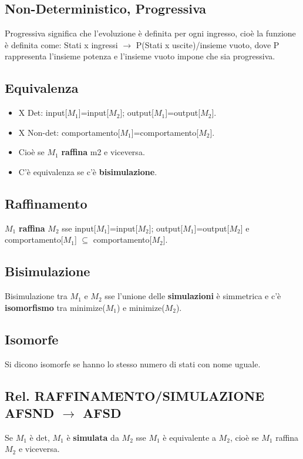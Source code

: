 \documentclass[a4paper]{article}
\begin{document}
\subsection{Non-Deterministico, Progressiva}
Progressiva significa che l'evoluzione è definita per ogni ingresso, cioè la funzione è definita come: Stati x ingressi $\rightarrow$ P(Stati x uscite)/insieme vuoto, dove P rappresenta l'insieme potenza e l'insieme vuoto impone che sia progressiva.

\subsection{Equivalenza}

\begin{itemize}
\item X Det: input[$M_1$]=input[$M_2$]; output[$M_1$]=output[$M_2$].
\item X Non-det: comportamento[$M_1$]=comportamento[$M_2$].
\item Cioè se $M_1$ \textbf{raffina} m2 e viceversa.
\item C'è equivalenza se c'è \textbf{bisimulazione}.
\end{itemize}

\subsection{Raffinamento}
$M_1$ \textbf{raffina} $M_2$ sse input[$M_1$]=input[$M_2$]; output[$M_1$]=output[$M_2$] e comportamento[$M_1$] $\subseteq$ comportamento[$M_2$].

\subsection{Bisimulazione}
Bisimulazione tra $M_1$ e $M_2$ sse l'unione delle \textbf{simulazioni} è simmetrica e c'è \textbf{isomorfismo} tra minimize($M_1$) e minimize($M_2$).

\subsection{Isomorfe}
Si dicono isomorfe se hanno lo stesso numero di stati con nome uguale.

\subsection{Rel. RAFFINAMENTO/SIMULAZIONE AFSND $\rightarrow$ AFSD} Se $M_1$ è det, $M_1$ è \textbf{simulata} da $M_2$ sse $M_1$ è equivalente a $M_2$, cioè se $M_1$ raffina $M_2$ e viceversa.
\end{document}
